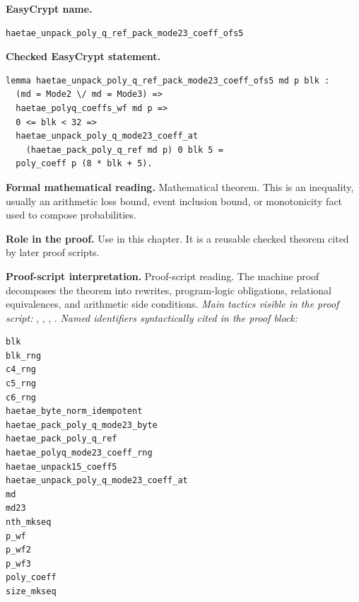 \begin{formaltheorem}
\noindent\textbf{EasyCrypt name.}
\begin{lstlisting}[language=EasyCrypt,basicstyle=\ttfamily\scriptsize]
haetae_unpack_poly_q_ref_pack_mode23_coeff_ofs5
\end{lstlisting}
\noindent\textbf{Checked EasyCrypt statement.}
\begin{lstlisting}[language=EasyCrypt,basicstyle=\ttfamily\scriptsize]
lemma haetae_unpack_poly_q_ref_pack_mode23_coeff_ofs5 md p blk :
  (md = Mode2 \/ md = Mode3) =>
  haetae_polyq_coeffs_wf md p =>
  0 <= blk < 32 =>
  haetae_unpack_poly_q_mode23_coeff_at
    (haetae_pack_poly_q_ref md p) 0 blk 5 =
  poly_coeff p (8 * blk + 5).
\end{lstlisting}
\noindent\textbf{Formal mathematical reading.}
Mathematical theorem. This is an inequality, usually an arithmetic loss bound, event inclusion bound, or monotonicity fact used to compose probabilities.

\noindent\textbf{Role in the proof.}
Use in this chapter. It is a reusable checked theorem cited by later proof scripts.

\noindent\textbf{Proof-script interpretation.}
Proof-script reading. The machine proof decomposes the theorem into rewrites, program-logic obligations, relational equivalences, and arithmetic side conditions.
\emph{Main tactics visible in the proof script:} , , , .
\emph{Named identifiers syntactically cited in the proof block:}
\begin{lstlisting}[language=EasyCrypt,basicstyle=\ttfamily\scriptsize]
blk
blk_rng
c4_rng
c5_rng
c6_rng
haetae_byte_norm_idempotent
haetae_pack_poly_q_mode23_byte
haetae_pack_poly_q_ref
haetae_polyq_mode23_coeff_rng
haetae_unpack15_coeff5
haetae_unpack_poly_q_mode23_coeff_at
md
md23
nth_mkseq
p_wf
p_wf2
p_wf3
poly_coeff
size_mkseq
\end{lstlisting}

\end{formaltheorem}

